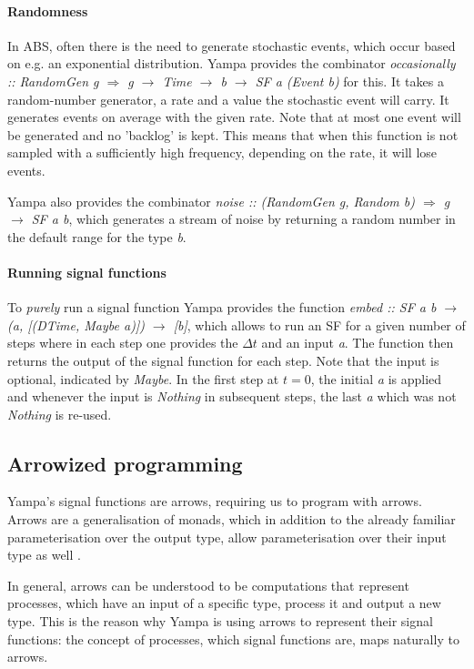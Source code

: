 \paragraph{Randomness}
In ABS, often there is the need to generate stochastic events, which occur based on e.g. an exponential distribution. Yampa provides the combinator \textit{occasionally :: RandomGen g $\Rightarrow$ g $\rightarrow$ Time $\rightarrow$ b $\rightarrow$ SF a (Event b)} for this. It takes a random-number generator, a rate and a value the stochastic event will carry. It generates events on average with the given rate. Note that at most one event will be generated and no 'backlog' is kept. This means that when this function is not sampled with a sufficiently high frequency, depending on the rate, it will lose events.

Yampa also provides the combinator \textit{noise :: (RandomGen g, Random b) $\Rightarrow$ g $\rightarrow$ SF a b}, which generates a stream of noise by returning a random number in the default range for the type \textit{b}.

\paragraph{Running signal functions}
To \textit{purely} run a signal function Yampa provides the function \textit{embed :: SF a b $\rightarrow$ (a, [(DTime, Maybe a)]) $\rightarrow$ [b]}, which allows to run an SF for a given number of steps where in each step one provides the $\Delta t$ and an input \textit{a}. The function then returns the output of the signal function for each step. Note that the input is optional, indicated by \textit{Maybe}. In the first step at $t = 0$, the initial \textit{a} is applied and whenever the input is \textit{Nothing} in subsequent steps, the last \textit{a} which was not \textit{Nothing} is re-used.

\subsection{Arrowized programming}
Yampa's signal functions are arrows, requiring us to program with arrows. Arrows are a generalisation of monads, which in addition to the already familiar parameterisation over the output type, allow parameterisation over their input type as well \cite{hughes_generalising_2000, hughes_programming_2005}.

In general, arrows can be understood to be computations that represent processes, which have an input of a specific type, process it and output a new type. This is the reason why Yampa is using arrows to represent their signal functions: the concept of processes, which signal functions are, maps naturally to arrows.

